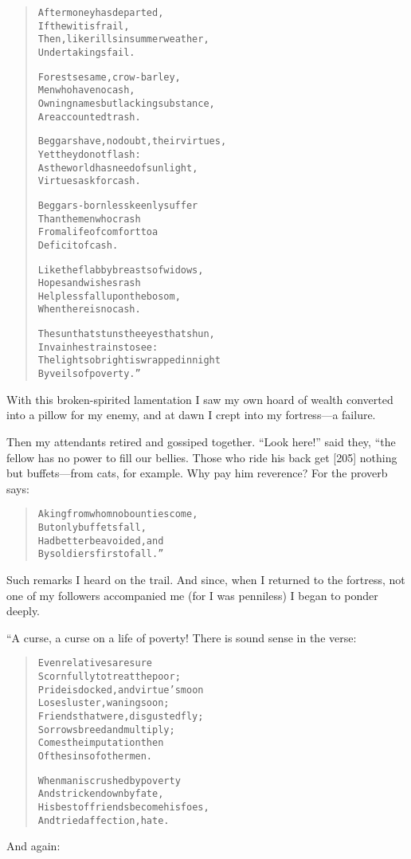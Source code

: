 \documentclass[article, twoside, 14pt]{memoir}
\renewenvironment{verbatim}{%
\begin{quote}%
\vskip -10pt%
\begin{alltt}\normalfont\large}{\end{alltt}%
\end{quote}%
\vskip -10pt
} %
\begin{document}
\begin{verbatim}
After money has departed,
    If the wit is frail,
Then, like rills in summer weather,
    Undertakings fail.

Forest sesame, crow-barley,
    Men who have no cash,
Owning names but lacking substance,
    Are accounted trash.

Beggars have, no doubt, their virtues,
    Yet they do not flash:
As the world has need of sunlight,
    Virtues ask for cash.

Beggars-born less keenly suffer
    Than the men who crash
From a life of comfort to a
    Deficit of cash.

Like the flabby breasts of widows,
    Hopes and wishes rash
Helpless fall upon the bosom,
    When there is no cash.

The sun that stuns the eyes that shun,
    In vain he strains to see:
The light so bright is wrapped in night
    By veils of poverty.”
\end{verbatim}
With this broken-spirited lamentation I saw my own hoard of wealth
converted into a pillow for my enemy, and at dawn I crept into my
fortress---a failure.

Then my attendants retired and gossiped together. ``Look here!''
said they, “the fellow has no power to fill our bellies. Those who
ride his back get [205] nothing but buffets---from cats, for
example. Why pay him reverence? For the proverb says:

\begin{verbatim}
A king from whom no bounties come,
    But only buffets fall,
Had better be avoided, and
    By soldiers first of all.”
\end{verbatim}
Such remarks I heard on the trail. And since, when I returned to
the fortress, not one of my followers accompanied me (for I was
penniless) I began to ponder deeply.

“A curse, a curse on a life of poverty! There is sound sense in the
verse:

\begin{verbatim}
Even relatives are sure
Scornfully to treat the poor;
Pride is docked, and virtue's moon
Loses luster, waning soon;
Friends that were, disgusted fly;
Sorrows breed and multiply;
Comes the imputation then
Of the sins of other men.

When man is crushed by poverty
    And stricken down by fate,
His best of friends become his foes,
    And tried affection, hate.
\end{verbatim}
And again:
\end{document}
